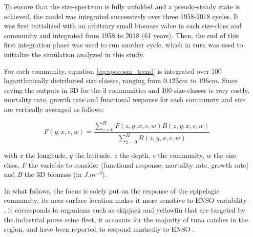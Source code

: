 To ensure that the size-spectrum is fully unfolded and a pseudo-steady state is achieved, the model was integrated successively over three 1958-2018 cycles. It was first initialized with an arbitrary small biomass value in each size-class and community and integrated from 1958 to 2018 (61 years). Then, the end of this first integration phase was used to run another cycle, which in turn was used to initialize the simulation analyzed in this study.

For each community, equation \ref{eq:apecosm_trend} is integrated over 100 logarithmically distributed size classes, ranging from $0.123cm$ to $196cm$. Since saving the outputs in 3D for the 3 communities and 100 size-classes is very costly, mortality rate, growth rate and functional response for each community and size are vertically averaged as follows:

\begin{equation}
F(y,x,c,w) = \frac{\sum_{z=0}^{H} F(z, y, x, c, w) B(z, y, x, c, w)}{\sum_{z=0}^{H}B(z, y, x, c, w	)}
\end{equation}

with $x$ the longitude, $y$ the latitude, $z$ the depth, $c$ the community, $w$ the size-class, $F$ the variable to consider (functional response, mortality rate, growth rate) and $B$ the 3D biomass (in $J.m^{-3}$).

In what follows, the focus is solely put on the response of the epipelagic community; its near-surface location makes it more sensitive to ENSO variability \citep{lemezoNaturalVariabilityMarine2016}, it corresponds to organisms such as skipjack and yellowfin that are targeted by the industrial purse seine fleet, it accounts for the majority of tuna catches in the region, and have been reported to respond markedly to ENSO \citep{lehodeyNinoSouthernOscillation1997}.
